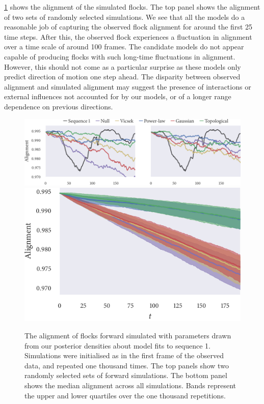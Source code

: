 \cref{fig:checks_seq1} shows the alignment of the simulated flocks. The top
panel shows the alignment of two sets of randomly selected simulations. We see
that all the models do a reasonable job of capturing the observed flock
alignment for around the first 25 time steps. After this, the observed flock
experiences a fluctuation in alignment over a time scale of around 100
frames. The candidate models do not appear capable of producing flocks with
such long-time fluctuations in alignment. However, this should not come as a
particular surprise as these models only predict direction of motion one step
ahead. The disparity between observed alignment and simulated alignment may
suggest the presence of interactions or external influences not accounted for
by our models, or of a longer range dependence on previous directions.

\begin{figure}[tbp]
  \includegraphics{alignment/alignment_single_1.pdf}\vspace{1em}\\
  \includegraphics{alignment/alignment_ensemble_1.pdf}
  \caption{The alignment of flocks forward simulated with parameters drawn from
    our posterior densities about model fits to sequence 1. Simulations were
    initialised as in the first frame of the observed data, and repeated one
    thousand times. The top panels show two randomly selected sets of forward
    simulations. The bottom panel shows the median alignment across all
    simulations. Bands represent the upper and lower quartiles over the one
    thousand repetitions.}
  \label{fig:checks_seq1}
\end{figure}

